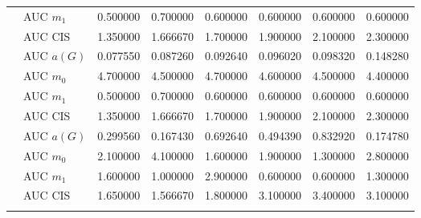 \begin{table}[htbp]
\begin{tabular}{llrrrrrr}
    & AUC $m_1$ & 0.500000 & 0.700000 & 0.600000 & 0.600000 & 0.600000 & 0.600000 \\
    & AUC CIS & 1.350000 & 1.666670 & 1.700000 & 1.900000 & 2.100000 & 2.300000 \\
    \addlinespace
    \multirow{4}{*}{degree} & AUC $a(G)$ & 0.077550 & 0.087260 & 0.092640 & 0.096020 & 0.098320 & 0.148280 \\
    & AUC $m_0$ & 4.700000 & 4.500000 & 4.700000 & 4.600000 & 4.500000 & 4.400000 \\
    & AUC $m_1$ & 0.500000 & 0.700000 & 0.600000 & 0.600000 & 0.600000 & 0.600000 \\
    & AUC CIS & 1.350000 & 1.666670 & 1.700000 & 1.900000 & 2.100000 & 2.300000 \\
    \addlinespace
    \multirow{4}{*}{random} & AUC $a(G)$ & 0.299560 & 0.167430 & 0.692640 & 0.494390 & 0.832920 & 0.174780 \\
    & AUC $m_0$ & 2.100000 & 4.100000 & 1.600000 & 1.900000 & 1.300000 & 2.800000 \\
    & AUC $m_1$ & 1.600000 & 1.000000 & 2.900000 & 0.600000 & 0.600000 & 1.300000 \\
    & AUC CIS & 1.650000 & 1.566670 & 1.800000 & 3.100000 & 3.400000 & 3.100000 \\
    \addlinespace
    \bottomrule
  \end{tabular}
\end{table}

